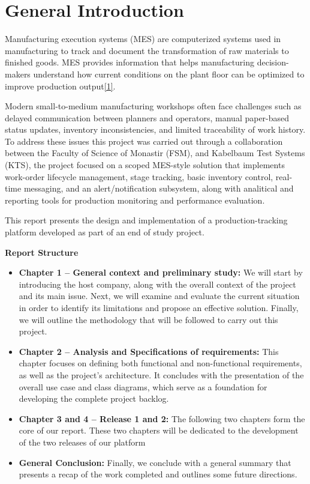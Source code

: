 \chapter*{General Introduction}
Manufacturing execution systems (MES) are computerized systems used in manufacturing to track and document the transformation of raw materials to finished goods. MES provides information that helps manufacturing decision-makers understand how current conditions on the plant floor can be optimized to improve production output\hyperref[ref:MESdefinition]{[1]}.

Modern small-to-medium manufacturing workshops often face challenges such as delayed communication between planners and operators, manual paper-based status updates, inventory inconsistencies, and limited traceability of work history. To address these issues this project was carried out through a collaboration between the Faculty of Science of Monastir (FSM), and Kabelbaum Test Systems (KTS), the project focused on a scoped MES-style solution that implements work-order lifecycle management, stage tracking, basic inventory control,  real-time messaging, and an alert/notification subsystem, along with analitical and reporting tools for production monitoring and performance evaluation.

This report presents the design and implementation of a production-tracking platform developed as part of an end of study project. 






\textbf{Report Structure}

\begin{itemize}
    \item \textbf{Chapter 1 -- General context and preliminary study: } We will start by introducing the host company, along with the overall context of the project and its main issue. Next, we will examine and evaluate the current situation in order to identify its limitations and propose an effective solution. Finally, we will outline the methodology that will be followed to carry out this project.
    \item \textbf{Chapter 2 -- Analysis and Specifications of requirements:} This chapter focuses on defining both functional and non-functional requirements, as well as the project’s architecture. It concludes with the presentation of the overall use case and class diagrams, which serve as a foundation for developing the complete project backlog. 
    \item \textbf{Chapter 3 and 4 -- Release 1 and 2:} The following two chapters form the core of our report. These two chapters will be dedicated to the development of the two releases of our platform
    
    \item \textbf{General Conclusion:} Finally, we conclude with a general summary that presents a recap of the work completed and outlines some future directions.
\end{itemize}
